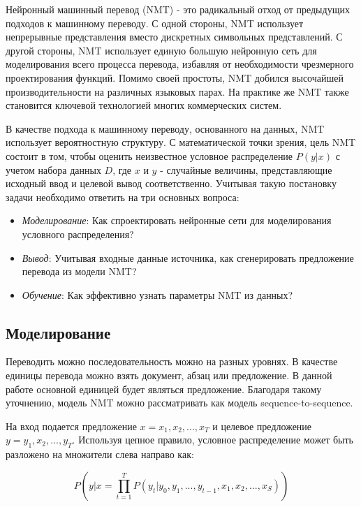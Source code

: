 	Нейронный машинный перевод (NMT) - это радикальный отход от предыдущих подходов к машинному переводу. С одной стороны, NMT использует непрерывные представления вместо дискретных символьных представлений. С другой стороны, NMT использует единую большую нейронную сеть для моделирования всего процесса перевода, избавляя от необходимости чрезмерного проектирования функций. Помимо своей простоты, NMT добился высочайшей производительности на различных языковых парах. На практике же NMT также становится ключевой технологией многих коммерческих систем.
	
	В качестве подхода к машинному переводу, основанного на данных, NMT использует вероятностную структуру. С математической точки зрения, цель NMT состоит в том, чтобы оценить неизвестное условное распределение $P(y|x)$ с учетом набора данных $D$, где $x$ и $y$ - случайные величины, представляющие исходный ввод и целевой вывод соответственно. Учитывая такую постановку задачи необходимо ответить на три основных вопроса:
	
	\begin{itemize}
		\item \textit{Моделирование}: Как спроектировать нейронные сети для моделирования условного распределения? 
		\item \textit{Вывод}: Учитывая входные данные источника, как сгенерировать предложение перевода из модели NMT?
		\item \textit{Обучение}: Как эффективно узнать параметры NMT из данных?
	\end{itemize}
    
    \subsection{Моделирование}
    
    Переводить можно последовательность можно на разных уровнях. В качестве единицы перевода можно взять документ, абзац или предложение. В данной работе основной единицей будет являться предложение. Благодаря такому уточнению, модель NMT можно рассматривать как модель sequence-to-sequence. 
    
    На вход подается предложение $x = {x_1, x_2, ... , x_T}$ и целевое предложение $y = {y_1, x_2, ... , y_T}$. Используя цепное правило, условное распределение может быть разложено на множители слева направо как:
    
    $$
        P(y|x = \prod\limits_{t = 1}^{T} P(y_t | y_0, y_1, ..., y_{t-1}, x_1, x_2, ..., x_S))
    $$
    
